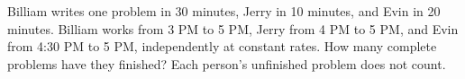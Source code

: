 Billiam writes one problem in 30 minutes, Jerry in 10 minutes, and Evin in 20 minutes. Billiam works from 3 PM to 5 PM, Jerry from 4 PM to 5 PM, and Evin from 4:30 PM to 5 PM, independently at constant rates. How many complete problems have they finished? Each person's unfinished problem does not count.
